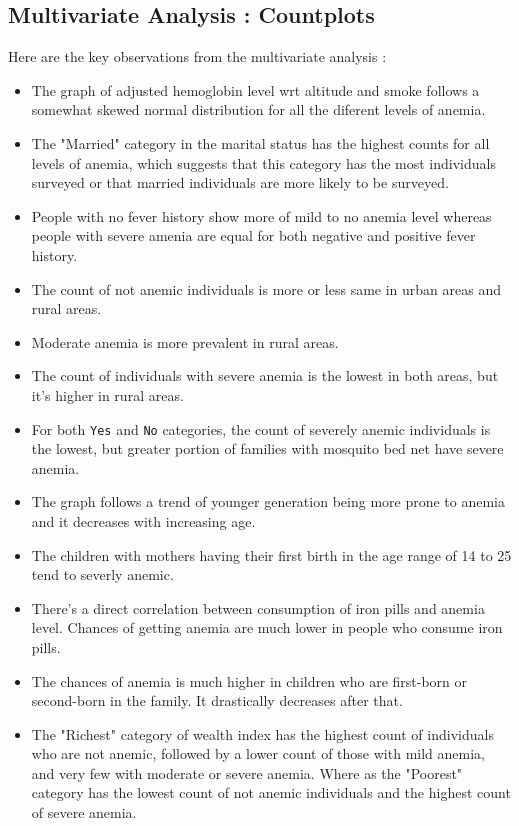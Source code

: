 \subsection{Multivariate Analysis : Countplots}

Here are the key observations from the multivariate analysis :
\begin{itemize}
	\item The graph of adjusted hemoglobin level wrt altitude and smoke follows a somewhat skewed normal distribution for all the diferent levels of anemia.
	\item The "Married" category in the marital status has the highest counts for all levels of anemia, which suggests that this category has the most individuals surveyed or that married individuals are more likely to be surveyed.
	\item People with no fever history show more of mild to no anemia level whereas people with severe amenia are equal for both negative and positive fever history.
    \item The count of not anemic individuals is more or less same in urban areas and rural areas.
	\item Moderate anemia is more prevalent in rural areas.
	\item The count of individuals with severe anemia is the lowest in both areas, but it's higher in rural areas.
	\item For both \texttt{Yes} and \texttt{No} categories, the count of severely anemic individuals is the lowest, but greater portion of families with mosquito bed net have severe anemia.
	\item The graph follows a trend of younger generation being more prone to anemia and it decreases with increasing age.
	\item The children with mothers having their first birth in the age range of 14 to 25 tend to severly anemic.
	\item There's a direct correlation between consumption of iron pills and anemia level. Chances of getting anemia are much lower in people who consume iron pills.
	\item The chances of anemia is much higher in children who are first-born or second-born in the family. It drastically decreases after that.
	\item The "Richest" category of wealth index has the highest count of individuals who are not anemic, followed by a lower count of those with mild anemia, and very few with moderate or severe anemia. Where as the "Poorest" category has the lowest count of not anemic individuals and the highest count of severe anemia.

\end{itemize}
